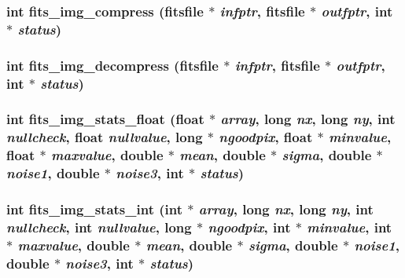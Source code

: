 \subsubsection{\setlength{\rightskip}{0pt plus 5cm}int fits\_\-img\_\-compress (\bf{fitsfile} $\ast$ {\em infptr}, \bf{fitsfile} $\ast$ {\em outfptr}, int $\ast$ {\em status})}\label{src_2fitsio_8h_aec457fa9e69872d1b50fcf7178c5a54}


\subsubsection{\setlength{\rightskip}{0pt plus 5cm}int fits\_\-img\_\-decompress (\bf{fitsfile} $\ast$ {\em infptr}, \bf{fitsfile} $\ast$ {\em outfptr}, int $\ast$ {\em status})}\label{src_2fitsio_8h_fe5b99742067b8d555a55b147af83cad}


\subsubsection{\setlength{\rightskip}{0pt plus 5cm}int fits\_\-img\_\-stats\_\-float (float $\ast$ {\em array}, long {\em nx}, long {\em ny}, int {\em nullcheck}, float {\em nullvalue}, long $\ast$ {\em ngoodpix}, float $\ast$ {\em minvalue}, float $\ast$ {\em maxvalue}, double $\ast$ {\em mean}, double $\ast$ {\em sigma}, double $\ast$ {\em noise1}, double $\ast$ {\em noise3}, int $\ast$ {\em status})}\label{src_2fitsio_8h_c543649b7428ec8840c8a9c6beac2cc9}


\subsubsection{\setlength{\rightskip}{0pt plus 5cm}int fits\_\-img\_\-stats\_\-int (int $\ast$ {\em array}, long {\em nx}, long {\em ny}, int {\em nullcheck}, int {\em nullvalue}, long $\ast$ {\em ngoodpix}, int $\ast$ {\em minvalue}, int $\ast$ {\em maxvalue}, double $\ast$ {\em mean}, double $\ast$ {\em sigma}, double $\ast$ {\em noise1}, double $\ast$ {\em noise3}, int $\ast$ {\em status})}\label{src_2fitsio_8h_75b334b5d2e8e4f22b80233208f8aaea}



